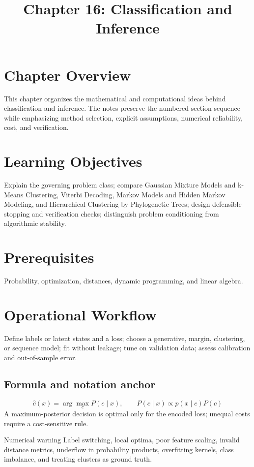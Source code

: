 \documentclass[10pt,letterpaper]{article}
\title{Chapter 16: Classification and Inference}
\author{}
\date{}
\begin{document}
\maketitle

\section*{Chapter Overview}
This chapter organizes the mathematical and computational ideas behind classification and inference. The notes preserve the numbered section sequence while emphasizing method selection, explicit assumptions, numerical reliability, cost, and verification.

\section*{Learning Objectives}
Explain the governing problem class; compare Gaussian Mixture Models and k-Means Clustering, Viterbi Decoding, Markov Models and Hidden Markov Modeling, and Hierarchical Clustering by Phylogenetic Trees; design defensible stopping and verification checks; distinguish problem conditioning from algorithmic stability.

\section*{Prerequisites}
Probability, optimization, distances, dynamic programming, and linear algebra.

\section*{Operational Workflow}
Define labels or latent states and a loss; choose a generative, margin, clustering, or sequence model; fit without leakage; tune on validation data; assess calibration and out-of-sample error.

\subsection*{Formula and notation anchor}
\[
\widehat{c}(x)=\arg\max_c P(c\mid x),\qquad P(c\mid x)\propto p(x\mid c)P(c)
\]
A maximum-posterior decision is optimal only for the encoded loss; unequal costs require a cost-sensitive rule.

\begin{warnbox}{Numerical warning}
Label switching, local optima, poor feature scaling, invalid distance metrics, underflow in probability products, overfitting kernels, class imbalance, and treating clusters as ground truth.
\end{warnbox}
\end{document}
